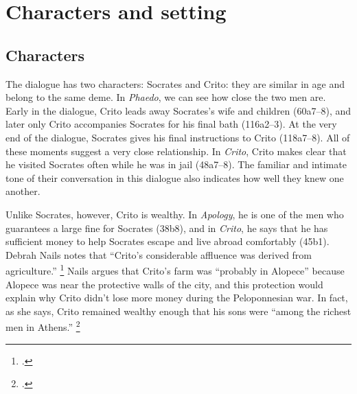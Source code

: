 \documentclass[12pt,letterpaper]{article}
\newcommand{\MONTH}{%
  \ifcase\the\month
  \or January%
  \or February%
  \or March%
  \or April%
  \or May%
  \or June%
  \or July%
  \or August%
  \or September%
  \or October%
  \or November%
  \or December%
  \fi}
\begin{document}

\pagestyle{notes}

\section*{Characters and setting}

\subsection*{Characters}

The dialogue has two characters: Socrates and Crito: they are similar in age and belong to the same deme.
 In \textit{Phaedo}, we can see how close the two men are.
Early in the dialogue, Crito leads away Socrates's wife and children (60a7--8), and later only Crito accompanies Socrates for his final bath (116a2--3).
At the very end of the dialogue, Socrates gives his final instructions to Crito (118a7--8).
All of these moments suggest a very close relationship.
In \textit{Crito}, Crito makes clear that he visited Socrates often while he was in jail (48a7--8).
The familiar and intimate tone of their conversation in this dialogue also indicates how well they knew one another.

Unlike Socrates, however, Crito is wealthy.
In \textit{Apology}, he is one of the men who guarantees a large fine for Socrates (38b8), and in \textit{Crito}, he says that he has sufficient money to help Socrates escape and live abroad comfortably (45b1).
Debrah Nails notes that ``Crito's considerable affluence was derived from agriculture.''%
\footcite[][115.
She cites \textit{Euthydemus} 291e, Xenophon's \textit{Memorabilia} 2.9.4, and Diogenes Laertius 2.31.]{nails2002-people-of-plato}
Nails argues that Crito's farm was ``probably in Alopece'' because Alopece was near the protective walls of the city, and this protection would explain why Crito didn't lose more money during the Peloponnesian war.
In fact, as she says, Crito remained wealthy enough that his sons were ``among the richest men in Athens.''%
\footcite[][115]{nails2002-people-of-plato}
\end{document}

